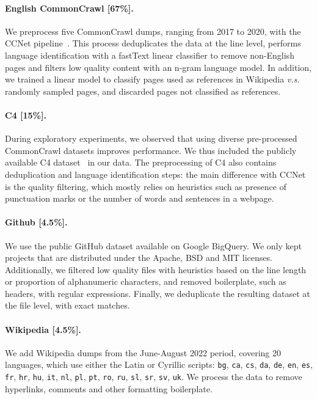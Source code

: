 \documentclass[11pt]{article}
\begin{document}
\paragraph{English CommonCrawl [67\%].} 
We preprocess five CommonCrawl dumps, ranging from 2017 to 2020, with the CCNet pipeline~\cite{wenzek-etal-2020-ccnet}.
This process deduplicates the data at the line level, performs language identification with a fastText linear classifier to remove non-English pages and filters low quality content with an n-gram language model.
In addition, we trained a linear model to classify pages used as references in Wikipedia \emph{v.s.} randomly sampled pages, and discarded pages not classified as references.

\paragraph{C4 [15\%].}
During exploratory experiments, we observed that using diverse pre-processed CommonCrawl datasets improves performance.
We thus included the publicly available C4 dataset~\citep{raffel2020exploring} in our data.
The preprocessing of C4 also contains deduplication and language identification steps: the main difference with CCNet is the quality filtering, which mostly relies on heuristics such as presence of punctuation marks or the number of words and sentences in a webpage.

\paragraph{Github [4.5\%].}
We use the public GitHub dataset available on Google BigQuery.
We only kept projects that are distributed under the Apache, BSD and MIT licenses.
Additionally, we filtered low quality files with heuristics based on the line length or proportion of alphanumeric characters, and removed boilerplate, such as headers, with regular expressions.
Finally, we deduplicate the resulting dataset at the file level, with exact matches.

\paragraph{Wikipedia [4.5\%].}
We add Wikipedia dumps from the June-August 2022 period, covering 20 languages, which use either the Latin or  Cyrillic scripts: \texttt{bg}, \texttt{ca}, \texttt{cs}, \texttt{da}, \texttt{de}, \texttt{en}, \texttt{es}, \texttt{fr}, \texttt{hr}, \texttt{hu}, \texttt{it}, \texttt{nl}, \texttt{pl}, \texttt{pt}, \texttt{ro}, \texttt{ru}, \texttt{sl}, \texttt{sr}, \texttt{sv}, \texttt{uk}.
We process the data to remove hyperlinks, comments and other formatting boilerplate.
\end{document}
